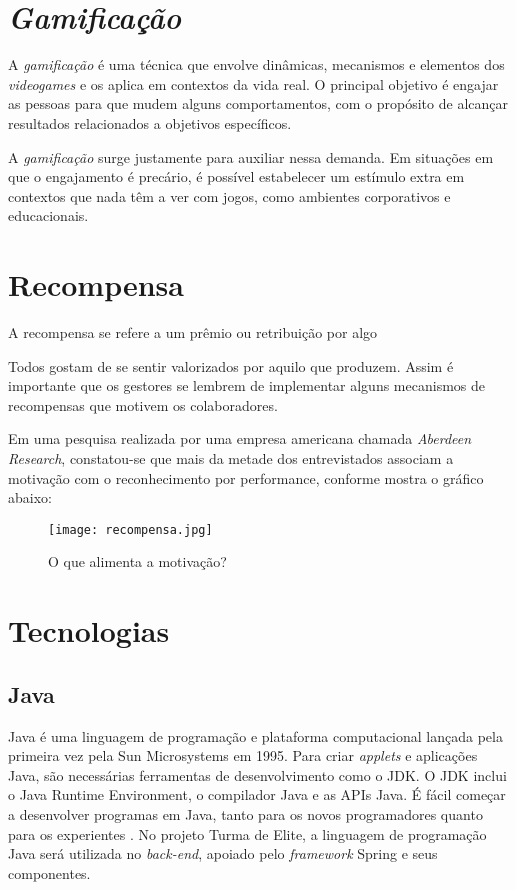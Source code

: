 \documentclass[
    12pt,               %
    openright,          %
    oneside,
    a4paper,            %
    paginasA3,  %
    MODELO,             %
    TODO,               %
    english,            %
    brazil              %
    ]{ifsp-spo-inf-ctds} %
\begin{document}
\section{\textit{Gamificação}}
A \textit{gamificação} é uma técnica que envolve dinâmicas, mecanismos e elementos dos \textit{videogames} e os aplica em contextos da vida real. O principal objetivo é engajar as pessoas para que mudem alguns comportamentos, com o propósito de alcançar resultados relacionados a objetivos específicos.


A \textit{gamificação} surge justamente para auxiliar nessa demanda. Em situações em que o engajamento é precário, é possível estabelecer um estímulo extra em contextos que nada têm a ver com jogos, como ambientes corporativos e educacionais. \cite{gamificacao-corporativa:2017}

\section{Recompensa}
A recompensa se refere a um prêmio ou retribuição por algo \cite{dicio-recompensa:2009}


Todos gostam de se sentir valorizados por aquilo que produzem. Assim é importante que os gestores se lembrem de implementar alguns mecanismos de recompensas que motivem os colaboradores. \cite{gamificacao-corporativa:2017}


Em uma pesquisa realizada por uma empresa americana chamada \textit{Aberdeen Research}, constatou-se que mais da metade dos entrevistados associam a motivação com o reconhecimento por performance, conforme mostra o gráfico abaixo:

\begin{figure}[htb]
    \centering
	\texttt{[image: recompensa.jpg]}
	\caption{\label{recompensa} O que alimenta a motivação?}
\end{figure}
\FloatBarrier


\section{Tecnologias}
\subsection{Java}
Java é uma linguagem de programação e plataforma computacional lançada pela primeira vez pela Sun Microsystems em 1995.
Para criar \textit{applets} e aplicações Java, são necessárias ferramentas de desenvolvimento como o JDK. O JDK inclui o Java Runtime Environment, o compilador Java e as APIs Java. É fácil começar a desenvolver programas em Java, tanto para os novos programadores quanto para os experientes \cite{java:2016}.
No projeto Turma de Elite, a linguagem de programação Java será utilizada no \textit{back-end}, apoiado pelo \textit{framework} Spring e seus componentes.
\end{document}
